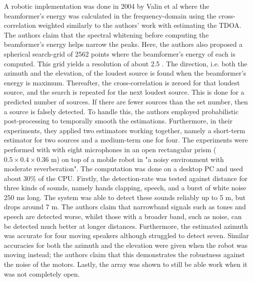 \documentclass{report}
\begin{document}
A robotic implementation was done in 2004 by Valin et al where the beamformer's energy was calculated in the frequency-domain using the cross-correlation weighted similarly to the authors' work with estimating the TDOA. The authors claim that the spectral whitening before computing the beamformer's energy helps narrow the peaks. Here, the authors also proposed a spherical search-grid of 2562 points where the beamformer's energy of each is computed. This grid yields a resolution of about 2.5 \si{\deg}. The direction, i.e. both the azimuth and the elevation, of the loudest source is found when the beamformer's energy is maximum. Thereafter, the cross-correlation is zeroed for that loudest source, and the search is repeated for the next loudest source. This is done for a predicted number of sources. If there are fewer sources than the set number, then a source is falsely detected. To handle this, the authors employed probabilistic post-processing to temporally smooth the estimations. Furthermore, in their experiments, they applied two estimators working together, namely a short-term estimator for two sources and a medium-term one for four. The experiments were performed with with eight microphones in an open rectangular prism ($0.5\times 0.4\times 0.36$ \si{m}) on top of a mobile robot in "a noisy environment with moderate reverberation". The computation was done on a desktop PC and used about 30\% of the CPU. Firstly, the detection-rate was tested against distance for three kinds of sounds, namely hands clapping, speech, and a burst of white noise 250 \si{ms} long. The system was able to detect these sounds reliably up to 5 \si{m}, but drops around 7 \si{m}. The authors claim that narrowband signals such as tones and speech are detected worse, whilst those with a broader band, such as noise, can be detected much better at longer distances. Furthermore, the estimated azimuth was accurate for four moving speakers although struggled to detect seven. Similar accuracies for both the azimuth and the elevation were given when the robot was moving instead; the authors claim that this demonstrates the robustness against the noise of the motors. Lastly, the array was shown to still be able work when it was not completely open.
\end{document}
